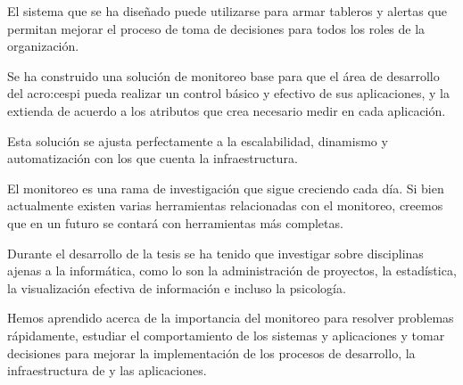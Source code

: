 El sistema que se ha diseñado puede utilizarse para armar tableros y alertas
que permitan mejorar el proceso de toma de decisiones para todos los roles de
la organización.

Se ha construido una solución de monitoreo base para que el
área de desarrollo del \gls{acro:cespi} pueda realizar un control básico y
efectivo de sus aplicaciones, y la extienda de acuerdo a los atributos que crea
necesario medir en cada aplicación.

Esta solución se ajusta perfectamente a la escalabilidad, dinamismo
y automatización con los que cuenta la infraestructura.

El monitoreo es una rama de investigación que sigue creciendo cada día. Si bien
actualmente existen varias herramientas relacionadas con el monitoreo, creemos
que en un futuro se contará con herramientas más completas.

Durante el desarrollo de la tesis se ha tenido que investigar sobre disciplinas
ajenas a la informática, como lo son la administración de proyectos, la
estadística, la visualización efectiva de información e incluso la psicología.

Hemos aprendido acerca de la importancia del monitoreo para resolver problemas
rápidamente, estudiar el comportamiento de los sistemas y aplicaciones y tomar
decisiones para mejorar la implementación de los procesos de desarrollo, la
infraestructura de  y las aplicaciones.
